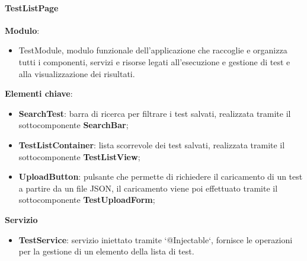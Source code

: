 \paragraph{TestListPage}
\textbf{Modulo}:
\begin{itemize}
    \item TestModule, modulo funzionale dell'applicazione che raccoglie e organizza tutti i componenti, servizi e risorse legati all'esecuzione e gestione di test e alla visualizzazione dei risultati.    
\end{itemize}
\textbf{Elementi chiave}:
\begin{itemize}
    \item \textbf{SearchTest}: barra di ricerca per filtrare i test salvati, realizzata tramite il sottocomponente \textbf{SearchBar};
    \item \textbf{TestListContainer}: lista scorrevole dei test salvati, realizzata tramite il sottocomponente \textbf{TestListView};
    \item \textbf{UploadButton}: pulsante che permette di richiedere il caricamento di un test a partire da un file JSON, il caricamento viene poi effettuato tramite il sottocomponente \textbf{TestUploadForm}; 
\end{itemize}
\textbf{Servizio}
\begin{itemize}
    \item \textbf{TestService}: servizio iniettato tramite `@Injectable`, fornisce le operazioni per la gestione di un elemento della lista di test.
\end{itemize}
